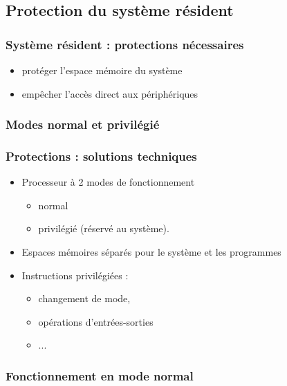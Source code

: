 \documentclass{beamer}
\begin{document}
\subsection{Protection du système résident}
\begin{frame}
\frametitle{Système résident : protections nécessaires}


\begin{itemize}
\item protéger l'espace mémoire du système
\item empêcher l'accès direct aux périphériques
\end{itemize}
\end{frame}

\subsubsection{Modes normal et privilégié}

\begin{frame}
\frametitle{Protections : solutions techniques}
\begin{itemize}
\item Processeur à 2 modes de fonctionnement
\begin{itemize}
\item \alert{normal} 
\item  \alert{privilégié}  (réservé au système). 
\end{itemize}
\item \alert{Espaces mémoires séparés} pour le système et les programmes
\item \alert{Instructions privilégiées} : 
\begin{itemize}
\item changement de mode, 
\item opérations d'entrées-sorties
\item ...
\end{itemize}
\end{itemize}
\end{frame}

\subsubsection{Fonctionnement en mode normal}
\end{document}
